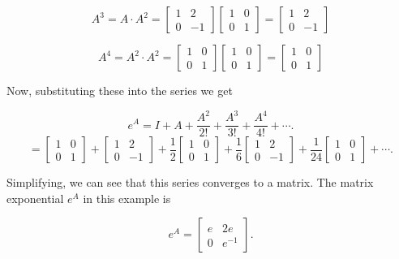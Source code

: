 \begin{definition}
\begin{example}
\[ A^3 = A \cdot A^2 = \begin{bmatrix} 1 & 2 \\ 0 & -1 \end{bmatrix} \begin{bmatrix} 1 & 0 \\ 0 & 1 \end{bmatrix} = \begin{bmatrix} 1 & 2 \\ 0 & -1 \end{bmatrix} \]

\[ A^4 = A^2 \cdot A^2 = \begin{bmatrix} 1 & 0 \\ 0 & 1 \end{bmatrix} \begin{bmatrix} 1 & 0 \\ 0 & 1 \end{bmatrix} = \begin{bmatrix} 1 & 0 \\ 0 & 1 \end{bmatrix} \]

Now, substituting these into the series we get

\[ e^A = I + A + \frac{A^2}{2!} + \frac{A^3}{3!} + \frac{A^4}{4!} + \cdots. \]
\[ = \begin{bmatrix} 1 & 0 \\ 0 & 1 \end{bmatrix} + \begin{bmatrix} 1 & 2 \\ 0 & -1 \end{bmatrix} + \frac{1}{2}\begin{bmatrix} 1 & 0 \\ 0 & 1 \end{bmatrix} + \frac{1}{6}\begin{bmatrix} 1 & 2 \\ 0 & -1 \end{bmatrix} + \frac{1}{24}\begin{bmatrix} 1 & 0 \\ 0 & 1 \end{bmatrix} + \cdots. \]

Simplifying, we can see that this series converges to a matrix. The matrix exponential \(e^A\) in this example is

\[ e^A = \begin{bmatrix} e & 2e \\ 0 & e^{-1} \end{bmatrix} .\]


\end{example}
\end{definition}
